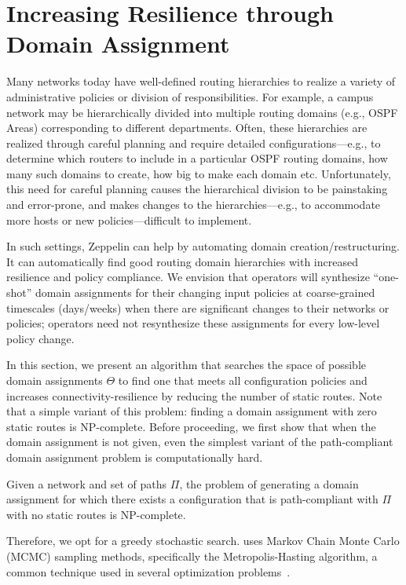 \section{Increasing Resilience through Domain Assignment}
\label{sec:synth-dom-ass}
Many networks today have well-defined routing hierarchies to realize a variety of administrative  policies or division of responsibilities. For example, a campus network may be hierarchically divided into multiple routing domains (e.g., OSPF Areas) corresponding to different departments. Often, these hierarchies are realized through careful planning and require detailed configurations---e.g., to determine which routers to include in a particular OSPF routing domains, how many such domains to create, how big to make each domain etc. Unfortunately, this 
need for careful planning
causes the hierarchical division to be painstaking and error-prone, and makes changes to  the hierarchies---e.g., to accommodate more hosts or new policies---difficult to implement.

In such settings, Zeppelin can help by automating domain creation/restructuring. It can automatically find good routing domain hierarchies with increased resilience and policy compliance. We envision that operators will synthesize ``one-shot'' domain assignments for their changing input policies at coarse-grained timescales (days/weeks) when there are significant changes to their networks or policies; operators need not resynthesize these assignments for every low-level policy change.


In this section, we present an algorithm 
that searches the space of possible domain assignments $\Theta$ to find
one that meets all configuration policies and increases 
connectivity-resilience by reducing the number of static routes.
Note that a simple variant of this problem: 
finding a domain assignment with
zero static routes is NP-complete.
\iffull
Before proceeding, we first show that when the domain assignment is not given,
even the simplest variant of the path-compliant domain assignment problem
is computationally hard.
\begin{theorem}
Given a
network and  set of paths  $\Pi$,
the problem of generating a domain assignment for which
there exists a 
configuration that is path-compliant with $\Pi$ with no static routes
is NP-complete.
\end{theorem}

\fi
Therefore, we opt for a greedy
stochastic search.
\name uses Markov
Chain Monte Carlo (MCMC) sampling methods, 
specifically the Metropolis-Hasting
algorithm, a common technique used in several optimization 
problems~\cite{stoke}. 

